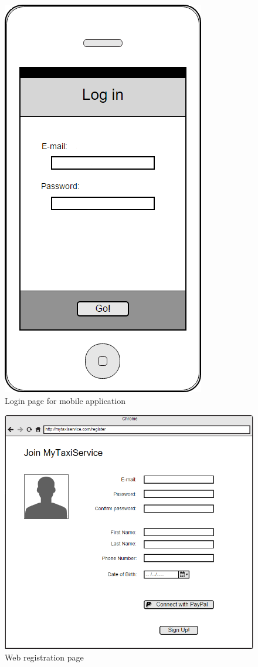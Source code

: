 \documentclass{article}
\begin{document}
\begin{figure}
    \centering
    \includegraphics[width=0.35\columnwidth]{Login1/Login1}
    \caption{Login page for mobile application}
    \label{fig:mobile-login}
\end{figure}

\begin{figure}[h!]
    \centering
    \includegraphics[width=0.5\columnwidth]{Register/Register}
    \caption{Web registration page}
    \label{fig:web-register}
\end{figure}

\newpage
\end{document}
